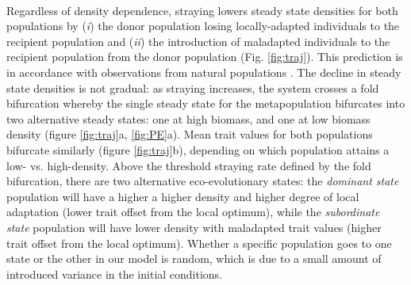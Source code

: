 \documentclass[twocolumn,preprintnumbers,amsmath,amssymb,superscriptaddress]{revtex4}
\begin{document}




 \\
\noindent Regardless of density dependence, straying lowers steady state densities for both populations by (\emph{i}) the donor population losing locally-adapted individuals to the recipient population and (\emph{ii}) the introduction of maladapted individuals to the recipient population from the donor population (Fig. \ref{fig:traj}).
This prediction is in accordance with observations from natural populations \cite{Bett:2017ha}. %
The decline in steady state densities is not gradual: as straying increases, the system crosses a fold bifurcation whereby the single steady state for the metapopulation bifurcates into two alternative steady states: one at high biomass, and one at low biomass density (figure \ref{fig:traj}a, \ref{fig:PE}a).
Mean trait values for both populations bifurcate similarly (figure \ref{fig:traj}b), depending on which population attains a low- vs. high-density. 
Above the threshold straying rate defined by the fold bifurcation, there are two alternative eco-evolutionary states: the \emph{dominant state} population will have a higher a higher density and higher degree of local adaptation (lower trait offset from the local optimum), while the \emph{subordinate state} population will have lower density with maladapted trait values (higher trait offset from the local optimum). 
Whether a specific population goes to one state or the other in our model is random, which is due to a small amount of introduced variance in the initial conditions.
\end{document}
